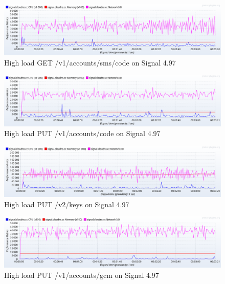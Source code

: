 \begin{figure}[H]
    \centering
    \includegraphics[width=\textwidth]{images/497/create-load-2}
    \caption{High load GET /v1/accounts/sms/code on Signal 4.97}
    \label{fig:signalload2old}
\end{figure}


\begin{figure}[H]
    \centering
    \includegraphics[width=\textwidth]{images/497/create-load-3}
    \caption{High load PUT /v1/accounts/code on Signal 4.97}
    \label{fig:signalload3old}
\end{figure}


\begin{figure}[H]
    \centering
    \includegraphics[width=\textwidth]{images/497/create-load-4}
    \caption{High load PUT /v2/keys on Signal 4.97}
    \label{fig:signalload4old}
\end{figure}


\begin{figure}[H]
    \centering
    \includegraphics[width=\textwidth]{images/497/create-load-5}
    \caption{High load PUT /v1/accounts/gcm on Signal 4.97}
    \label{fig:signalload5old}
\end{figure}


